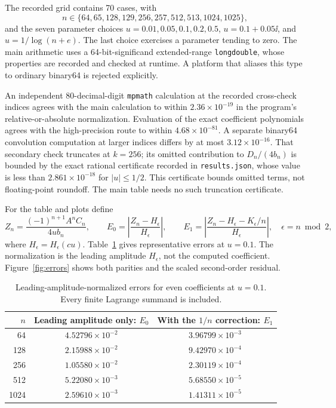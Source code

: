 The recorded grid contains 70 cases, with
\[
 n\in\{64,65,128,129,256,257,512,513,1024,1025\},
\]
and the seven parameter choices
$u=0.01,0.05,0.1,0.2,0.5$, $u=0.1+0.05\ii$, and
$u=1/\log(n+e)$. The last choice exercises a parameter tending to zero.
The main arithmetic uses a 64-bit-significand extended-range
\texttt{longdouble}, whose properties are recorded and checked at
runtime. A platform that aliases this type to ordinary binary64 is
rejected explicitly.

An independent 80-decimal-digit \texttt{mpmath} calculation at the
recorded cross-check indices agrees with the main calculation to within
$2.36\times10^{-19}$ in the program's relative-or-absolute normalization.
Evaluation of the exact coefficient polynomials agrees with the
high-precision route to within $4.68\times10^{-81}$.
A separate binary64 convolution computation at larger indices differs
by at most $3.12\times10^{-16}$. That secondary check truncates at
$k=256$; its omitted contribution to $D_n/(4b_n)$ is bounded by the
exact rational certificate recorded in \texttt{results.json}, whose
value is less than $2.861\times10^{-18}$ for $|u|\le1/2$.
This certificate bounds omitted terms, not floating-point roundoff.
The main table needs no such truncation certificate.

For the table and plots define
\[
 Z_n=\frac{(-1)^{n+1}A^nC_n}{4ub_n},\qquad
 E_0=\left|\frac{Z_n-H_\epsilon}{H_\epsilon}\right|,\qquad
 E_1=\left|\frac{Z_n-H_\epsilon-K_\epsilon/n}{H_\epsilon}\right|,
 \quad \epsilon=n\bmod2,
\]
where $H_\epsilon=H_\epsilon(cu)$.
Table~\ref{tab:errors} gives representative errors at $u=0.1$.
The normalization is the leading amplitude $H_\epsilon$, not the
computed coefficient. Figure~\ref{fig:errors} shows both parities and
the scaled second-order residual.

\begin{table}[htbp]
\centering
\caption{Leading-amplitude-normalized errors for even coefficients at
$u=0.1$. Every finite Lagrange summand is included.}
\label{tab:errors}
\begin{tabular}{rcc}
\toprule
$n$ & Leading amplitude only: $E_0$ & With the $1/n$ correction: $E_1$\\
\midrule
64   & $4.52796\times10^{-2}$ & $3.96799\times10^{-3}$\\
128  & $2.15988\times10^{-2}$ & $9.42970\times10^{-4}$\\
256  & $1.05580\times10^{-2}$ & $2.30119\times10^{-4}$\\
512  & $5.22080\times10^{-3}$ & $5.68550\times10^{-5}$\\
1024 & $2.59610\times10^{-3}$ & $1.41311\times10^{-5}$\\
\bottomrule
\end{tabular}
\end{table}

